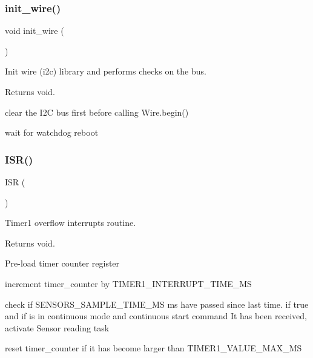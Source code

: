 \subsubsection{\texorpdfstring{init\+\_\+wire()}{init\_wire()}}
{\footnotesize\ttfamily void init\+\_\+wire (\begin{DoxyParamCaption}\item[{void}]{ }\end{DoxyParamCaption})}



Init wire (i2c) library and performs checks on the bus. 

\begin{DoxyReturn}{Returns}
void. 
\end{DoxyReturn}
clear the I2C bus first before calling Wire.\+begin()

wait for watchdog reboot \mbox{\label{i2c-th_8ino_ab16889ae984b9b798989a0d239283cac}} 
\subsubsection{\texorpdfstring{I\+S\+R()}{ISR()}}
{\footnotesize\ttfamily I\+SR (\begin{DoxyParamCaption}\item[{T\+I\+M\+E\+R1\+\_\+\+O\+V\+F\+\_\+vect}]{ }\end{DoxyParamCaption})}



Timer1 overflow interrupts routine. 

\begin{DoxyReturn}{Returns}
void. 
\end{DoxyReturn}
Pre-\/load timer counter register

increment timer\+\_\+counter by T\+I\+M\+E\+R1\+\_\+\+I\+N\+T\+E\+R\+R\+U\+P\+T\+\_\+\+T\+I\+M\+E\+\_\+\+MS

check if S\+E\+N\+S\+O\+R\+S\+\_\+\+S\+A\+M\+P\+L\+E\+\_\+\+T\+I\+M\+E\+\_\+\+MS ms have passed since last time. if true and if is in continuous mode and continuous start command It has been received, activate Sensor reading task

reset timer\+\_\+counter if it has become larger than T\+I\+M\+E\+R1\+\_\+\+V\+A\+L\+U\+E\+\_\+\+M\+A\+X\+\_\+\+MS \mbox{\label{i2c-th_8ino_a32a64a2800c724fb28e10636f2ec20b9}} 
